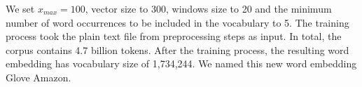 We set $x_{max} = 100$, vector size to 300, windows size to 20 and the minimum number of word occurrences to be included in the vocabulary to 5.
The training process took the plain text file from preprocessing steps as input.
In total, the corpus contains 4.7 billion tokens.
After the training process, the resulting word embedding has vocabulary size of 1,734,244.
We named this new word embedding Glove Amazon.
